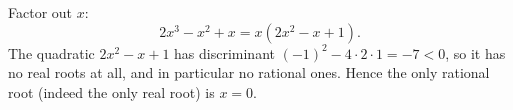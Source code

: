 Factor out $x$:
\[2x^3-x^2+x=x\left(2x^2-x+1\right).\]
The quadratic $2x^2-x+1$ has discriminant $(-1)^2-4\cdot2\cdot1=-7<0$, so it has no real roots at all, and in particular no rational ones. Hence the only rational root (indeed the only real root) is $\boxed{x=0}$.

